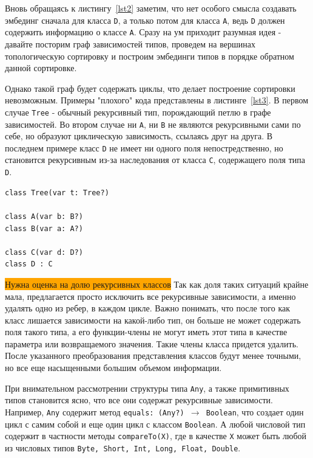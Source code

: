 \documentclass[times,specification,annotation]{itmo-student-thesis}
\begin{document}
Вновь обращаясь к листингу~\ref{lst2} заметим, что нет особого смысла создавать эмбединг сначала для класса \texttt{D}, а только потом для класса \texttt{A}, ведь \texttt{D} должен содержить информацию о классе \texttt{A}. Сразу на ум приходит разумная идея - давайте посторим граф зависимостей типов, проведем на вершинах топологическую сортировку и построим эмбединги типов в порядке обратном данной сортировке.

Однако такой граф будет содержать циклы, что делает построение сортировки невозможным. Примеры "плохого" кода представлены в листинге~\ref{lst3}. В первом случае \texttt{Tree} - обычный рекурсивный тип, порождающий петлю в графе зависимостей. Во втором случае ни \texttt{A}, ни \texttt{B} не являются рекурсивными сами по себе, но образуют циклическую зависимость, ссылаясь друг на друга. В последнем примере класс \texttt{D} не имеет ни одного поля непостредственно, но становится рекурсивным из-за наследования от класса \texttt{C}, содержащего поля типа \texttt{D}.

\begin{lstlisting}[float=!h,caption={Типы с циклическими зависимостями},label={lst3}]
class Tree(var t: Tree?)

class A(var b: B?)
class B(var a: A?)

class C(var d: D?)
class D : C
\end{lstlisting}

\colorbox{orange}{Нужна оценка на долю рекурсивных классов}
Так как доля таких ситуаций крайне мала, предлагается просто исключить все рекурсивные зависимости, а именно удалять одно из ребер, в каждом цикле. Важно понимать, что после того как класс лишается зависимости на какой-либо тип, он больше не может содержать поля такого типа, а его функции-члены не могут иметь этот типа в качестве параметра или возвращаемого значения. Такие члены класса придется удалить. После указанного преобразования представления классов будут менее точными, но все еще насыщенными большим объемом информации.

При внимательном рассмотрении структуры типа \texttt{Any}, а также примитивных типов становится ясно, что все они содержат рекурсивные зависимости. Например, \texttt{Any} содержит метод \texttt{equals: (Any?)  $\rightarrow$ Boolean}, что создает один цикл с самим собой и еще один цикл с классом \texttt{Boolean}. А любой числовой тип содержит в частности методы \texttt{compareTo(X)}, где в качестве \texttt{X} может быть любой из числовых типов \texttt{Byte, Short, Int, Long, Float, Double}. 
\end{document}
